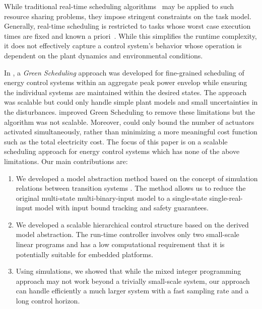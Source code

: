 While traditional real-time scheduling algorithms~\cite{realtimesys} may be applied to such resource sharing problems, they impose stringent constraints on the task model.
Generally, real-time scheduling is restricted to tasks whose worst case execution times are fixed and known a priori~\cite{rts}.
While this simplifies the runtime complexity, %
it does not effectively capture a control system's behavior whose operation is dependent on the plant dynamics and environmental conditions. 

In \cite{nghiemetal12ssb}, %
a \emph{Green Scheduling} approach was developed for fine-grained scheduling of energy control systems within an aggregate peak power envelop while ensuring the individual systems are maintained within the desired states.
The approach was scalable but could only handle simple plant models and small uncertainties in the disturbances.
\cite{nghiemetal13ebg} improved Green Scheduling to remove these limitations but the algorithm was not scalable.
Moreover, \cite{nghiemetal12ssb,nghiemetal13ebg} could only bound the number of actuators activated simultaneously, rather than minimizing a more meaningful cost function such as the total electricity cost.
%
The focus of this paper is on a scalable %
scheduling approach for energy control systems which has none of the above limitations.
Our main contributions are:
\begin{enumerate}
\item We developed a model abstraction method based on the concept of simulation relations between transition systems \cite{aluretal00dah,girardetal07amd}.  The method allows us to reduce the original multi-state multi-binary-input model to a single-state single-real-input model with input bound tracking and safety guarantees.
\item We developed a scalable hierarchical control structure based on the derived model abstraction.  The run-time controller involves only two small-scale linear programs and has a low computational requirement that it is potentially suitable for embedded platforms.  
\item Using simulations, we showed that while the mixed integer programming approach \cite{sou2011scheduling,zhang2011optimal} may not work beyond a trivially small-scale system, our approach can handle efficiently a much larger system with a fast sampling rate and a long control horizon.
\end{enumerate}
 

